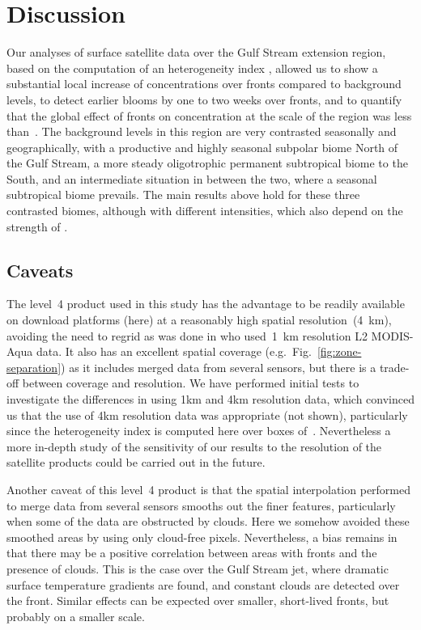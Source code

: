 \section{Discussion}

Our analyses of surface satellite data over the Gulf Stream extension region, based on the computation of an heterogeneity index , allowed us to show a substantial local increase of  concentrations over  fronts compared to background levels, to detect earlier blooms by one to two weeks over fronts, and to quantify that the global effect of fronts on  concentration at the scale of the region was less than~.
The background levels in this region are very contrasted seasonally and geographically, with a productive and highly seasonal subpolar biome North of the Gulf Stream, a more steady oligotrophic permanent subtropical biome to the South, and an intermediate situation in between the two, where a seasonal subtropical biome prevails.
The main results above hold for these three contrasted biomes, although with different intensities, which also depend on the strength of .

\subsection{Caveats}

The level~4  product used in this study has the advantage to be readily available on download platforms (here) at a reasonably high spatial resolution~(\qty{4}{\km}), avoiding the need to regrid as was done in \textcite{liu_2016} who used~\qty{1}{\km} resolution L2 MODIS-Aqua data.
It also has an excellent spatial coverage (e.g.\ Fig.~\ref{fig:zone-separation}) as it includes merged data from several sensors, but there is a trade-off between coverage and resolution.
We have performed initial tests to investigate the differences in using 1km and 4km resolution  data, which convinced us that the use of 4km resolution data was appropriate (not shown), particularly since the heterogeneity index  is computed here over boxes of~.
Nevertheless a more in-depth study of the sensitivity of our results to the resolution of the satellite products could be carried out in the future.

Another caveat of this level~4 product is that the spatial interpolation performed to merge data from several sensors smooths out the finer features, particularly when some of the data are obstructed by clouds.
Here we somehow avoided these smoothed areas by using only cloud-free  pixels.
Nevertheless, a bias remains in that there may be a positive correlation between areas with fronts and the presence of clouds.
This is the case over the Gulf Stream jet, where dramatic surface temperature gradients are found, and constant clouds are detected over the front.
Similar effects can be expected over smaller, short-lived fronts, but probably on a smaller scale.


